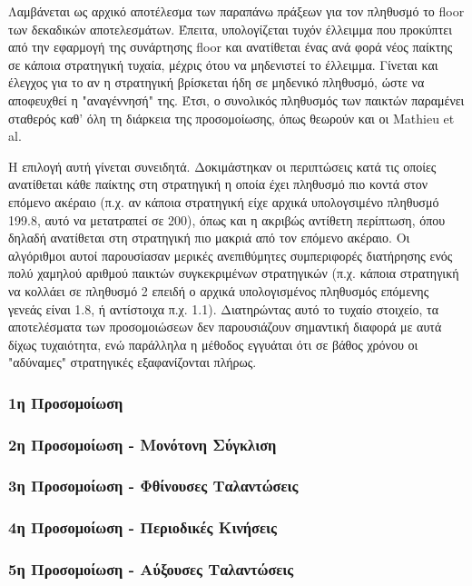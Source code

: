 \documentclass[12pt]{article}
\begin{document}
Λαμβάνεται ως αρχικό αποτέλεσμα των παραπάνω πράξεων για τον πληθυσμό το floor των δεκαδικών αποτελεσμάτων. Έπειτα, υπολογίζεται τυχόν έλλειμμα που προκύπτει από την εφαρμογή της συνάρτησης floor και ανατίθεται ένας ανά φορά νέος παίκτης σε κάποια στρατηγική τυχαία, μέχρις ότου να μηδενιστεί το έλλειμμα. Γίνεται και έλεγχος για το αν η στρατηγική βρίσκεται ήδη σε μηδενικό πληθυσμό, ώστε να αποφευχθεί η "αναγέννησή" της. Έτσι, ο συνολικός πληθυσμός των παικτών παραμένει σταθερός καθ' όλη τη διάρκεια της προσομοίωσης, όπως θεωρούν και οι Mathieu et al.

Η επιλογή αυτή γίνεται συνειδητά. Δοκιμάστηκαν οι περιπτώσεις κατά τις οποίες ανατίθεται κάθε παίκτης στη στρατηγική η οποία έχει πληθυσμό πιο κοντά στον επόμενο ακέραιο (π.χ. αν κάποια στρατηγική είχε αρχικά υπολογσιμένο πληθυσμό 199.8, αυτό να μετατραπεί σε 200), όπως και η ακριβώς αντίθετη περίπτωση, όπου δηλαδή ανατίθεται στη στρατηγική πιο μακριά από τον επόμενο ακέραιο. Οι αλγόριθμοι αυτοί παρουσίασαν μερικές ανεπιθύμητες συμπεριφορές διατήρησης ενός πολύ χαμηλού αριθμού παικτών συγκεκριμένων στρατηγικών (π.χ. κάποια στρατηγική να κολλάει σε πληθυσμό 2 επειδή ο αρχικά υπολογισμένος πληθυσμός επόμενης γενεάς είναι 1.8, ή αντίστοιχα π.χ. 1.1). Διατηρώντας αυτό το τυχαίο στοιχείο, τα αποτελέσματα των προσομοιώσεων δεν παρουσιάζουν σημαντική διαφορά με αυτά δίχως τυχαιότητα, ενώ παράλληλα η μέθοδος εγγυάται ότι σε βάθος χρόνου οι "αδύναμες" στρατηγικές εξαφανίζονται πλήρως.
\subsubsection{1η Προσομοίωση}

\subsubsection{2η Προσομοίωση - Μονότονη Σύγκλιση}

\subsubsection{3η Προσομοίωση - Φθίνουσες Ταλαντώσεις}

\subsubsection{4η Προσομοίωση - Περιοδικές Κινήσεις}

\subsubsection{5η Προσομοίωση - Αύξουσες Ταλαντώσεις}
\end{document}
